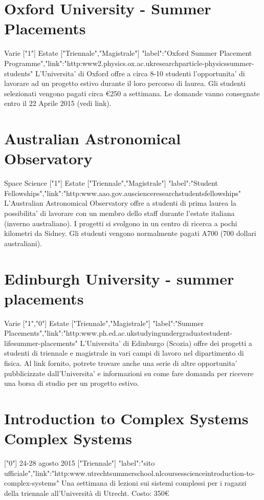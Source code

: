 \documentclass[a4paper,10pt]{article}
\begin{document}
\section{	Oxford University - Summer Placements	}Varie	["1"]	Estate	["Triennale","Magistrale"]	{"label":"Oxford Summer Placement Programme","link":"http:\/\/www2.physics.ox.ac.uk\/research\/particle-physics\/summer-students"}	L'Universita' di Oxford offre a circa 8-10 studenti l'opportunita' di lavorare ad un progetto estivo durante il loro percorso di laurea. Gli studenti selezionati vengono pagati circa €250 a settimana. Le domande vanno consegnate entro il 22 Aprile 2015 (vedi link).	

\section{	Australian Astronomical Observatory}	Space Science	["1"]	Estate	["Triennale","Magistrale"]	{"label":"Student Fellowships","link":"http:\/\/www.aao.gov.au\/science\/research\/students\/fellowships"}	L'Australian Astronomical Observatory offre a studenti di prima laurea la possibilita' di lavorare con un membro dello staff durante l'estate italiana (inverno australiano). I progetti si svolgono in un centro di ricerca a pochi kilometri da Sidney. Gli studenti vengono normalmente pagati A700 (700 dollari australiani). 	

\section{	Edinburgh University - summer placements	}Varie	["1","0"]	Estate	["Triennale","Magistrale"]	{"label":"Summer Placements","link":"http:\/\/www.ph.ed.ac.uk\/studying\/undergraduate\/student-life\/summer-placements"}	L'Universita' di Edinburgo (Scozia) offre dei progetti a studenti di triennale e magistrale in vari campi di lavoro nel dipartimento di fisica. Al link fornito, potrete trovare anche una serie di altre opportunita' pubblicizzate dall'Universita' e informazioni su come fare domanda per ricevere una borsa di studio per un progetto estivo. 	

\section{	Introduction to Complex Systems	Complex Systems	}["0"]	24-28 agosto 2015	["Triennale"]	{"label":"sito ufficiale","link":"http:\/\/www.utrechtsummerschool.nl\/courses\/science\/introduction-to-complex-systems"}	Una settimana di lezioni sui sistemi complessi per i ragazzi della triennale all'Università di Utrecht. Costo: 350€	
\end{document}
